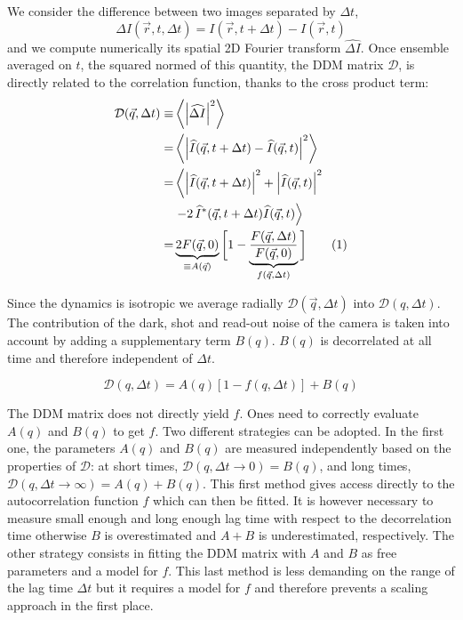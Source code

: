 \documentclass[prb,reprint,amsmath,amssymb]{revtex4-1}
\newcommand{\tg}[1]{{\color{magenta}#1}} %
\begin{document}
 We consider the difference between two images separated by $\Delta t$,
\begin{equation}
\Delta I(\vec{r},t, \Delta t) = I(\vec{r}, t+\Delta t) - I(\vec{r}, t)
\label{eq:DI}
\end{equation}
%
and we compute numerically its spatial 2D Fourier transform $\widehat{\Delta I}$. Once ensemble averaged on $t$, the squared normed of this quantity, the DDM matrix $\mathcal{D}$, is directly related to the correlation function, thanks to the cross product term:
\begin{align*}
\mathcal{D}(\vec{q},\Delta t) \equiv& \left\langle \left|\widehat{\Delta I}\right|^2 \right\rangle\\
 =& \left\langle \left|\widehat{I}(\vec{q},t+\Delta t) - \widehat{I}(\vec{q},t)\right|^2 \right\rangle \\
=& \left\langle \left|\widehat{I}(\vec{q},t+ \Delta t)\right|^2 + \left|\widehat{I}(\vec{q},t)\right|^2\right. \\
&\left.- 2 \, \widehat{I}^*(\vec{q},t+\Delta t) \widehat{I}(\vec{q},t) \right\rangle\\
=& \underbrace{2F(\vec{q}, 0)}_{\equiv A(\vec{q})} \bigg[ 1-\underbrace{\frac{F(\vec{q}, \Delta t)}{F(\vec{q}, 0)}}_{f(\vec{q}, \Delta t)} \bigg] \addtocounter{equation}{1}\tag{\theequation} \label{eq:DDM}
\end{align*}


\tg{Since the dynamics is isotropic we average radially $\mathcal{D}(\vec{q},\Delta t)$ into $\mathcal{D}(q,\Delta t)$.} The contribution of the \tg{dark, shot and read-out noise\cite{Mignard2015,Joubert2011}} of the camera is taken into account by adding a supplementary term $B(q)$. $B(q)$ is decorrelated  at all time and therefore independent of $\Delta t$.

\begin{equation}
\mathcal{D}(q,\Delta t) = A(q)\left[1-f(q, \Delta t)\right] + B(q)
\label{eq:D2f}
\end{equation}

\tg{The DDM matrix does not directly yield $f$. Ones need to correctly evaluate $A(q)$ and $B(q)$ to get $f$. Two different strategies can be adopted. In the first one, the parameters $A(q)$ and $B(q)$ are measured independently based on the properties of $\mathcal{D}$: at short times, $\mathcal{D}(q,\Delta t\rightarrow 0) = B(q)$, and long times, $\mathcal{D}(q,\Delta t\rightarrow \infty) = A(q)+B(q)$. This first method gives access directly to the autocorrelation function $f$ which can then be fitted. It is however necessary to measure small enough and  long enough lag time with respect to the decorrelation time otherwise $B$ is overestimated and $A+B$ is underestimated, respectively. The other strategy consists in fitting the DDM matrix with $A$ and $B$ as free parameters and a model for $f$. This last method is less demanding on the range of the lag time $\Delta t$ but it requires a model for $f$ and therefore prevents a scaling approach in the first place.}
\end{document}
